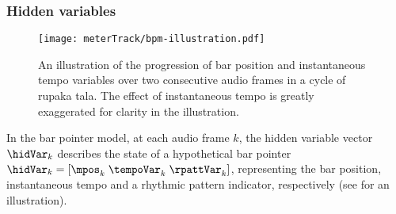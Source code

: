 \subsubsection{Hidden variables}
\begin{figure}[t]
\centering
	\texttt{[image: meterTrack/bpm-illustration.pdf]}
	\caption[An illustration of the bar pointer model]{An illustration of the progression of bar position and instantaneous tempo variables over two consecutive audio frames in a cycle of \gls{rupaka} \gls{tala}. The effect of instantaneous tempo is greatly exaggerated for clarity in the illustration.}
	\label{fig:bpm:illustration}
\end{figure}
%
In the bar pointer model, at each audio frame $k$, the hidden variable vector $\hidVar_{k}$ describes the state of a hypothetical bar pointer $\hidVar_{k} = [\mpos_k \; \tempoVar_k \; \rpattVar_k]$, representing the bar position, instantaneous tempo and a rhythmic pattern indicator, respectively (see  for an illustration).
%
